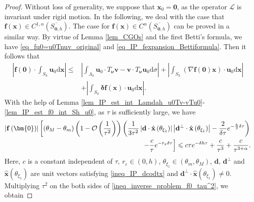 \documentclass[11pt,reqno,oneside]{amsart}
\theoremstyle{definition}
\theoremstyle{remark}
\numberwithin{equation}{section}
\numberwithin{equation}{section}
\theoremstyle{remark}
\begin{document}
\begin{proof} 
	Without loss of generality, we suppose that $ \mathbf{x}_0 = \bm{0} $, as the operator $ \mathcal{L} $ is invariant under rigid motion. In the following, we deal with the case that $\mathbf{f}\left(\mathbf{x}\right) \in C^{1,\alpha} \left(\overline{S_{\mathbf{0},h}}\right)$. The case for $\mathbf{f}\left(\mathbf{x}\right) \in C^{\alpha} \left(\overline{S_{\mathbf{0},h}}\right)$ can be proved in a similar way. By virtue of Lemma \ref{lem_CGOs} and the first Betti's formula, we have \eqref{eq_fu0=u0Tnuv_original} and \eqref{eq_IP_fexpansion_Bettiformula}. Then it follows that
	\begin{align*} 
		\left| \mathbf{f} \left(\bm{0}\right) \cdot \int_{S_h} \mathbf{u}_0 \mathrm{d}\mathbf{x} \right|	\leqslant & \left| \int_{\Lambda_h} \mathbf{u}_0 \cdot T_{\bm{\nu}} \mathbf{v} - \mathbf{v} \cdot T_{\bm{\nu}} \mathbf{u}_0 \mathrm{d}\sigma \right| + \left| \int_{S_h} \left( \nabla \mathbf{f} \left(\bm{0}\right) \mathbf{x} \right) \cdot \mathbf{u}_0 \mathrm{d}\mathbf{x} \right| \\
		& + \left| \int_{S_h} \bm{\delta} \mathbf{f} \left(\mathbf{x}\right) \cdot \mathbf{u}_0 \mathrm{d}\mathbf{x} \right|. 
	\end{align*}
	With the help of Lemma \ref{lem_IP_est_int_Lamdah_u0Tv-vTu0}-\ref{lem_IP_est_f0_int_Sh_u0}, as $ \tau $ is sufficiently large, we have  
	\begin{align} \label{ineq_inverse_problem_f0_tau^2}
		\left| \mathbf{f}\left(\bm{0}\right) \right|\left[\left(\theta_M-\theta_m\right)\left(1-\mathcal{O}\left(\frac{1}{\tau^2}\right)\right) \left(\frac{1}{3 \tau^2}\left|\mathbf{d}\cdot\hat{\mathbf{x}} \left(\theta_{\xi_1}\right)\right| \left|\mathbf{d}^{\perp}\cdot\hat{\mathbf{x}} \left(\theta_{\xi_1}\right)\right| - \frac{2}{\delta\tau} e^{-\frac{h}{2} \delta \tau}\right) \right. \notag \\
		\left.- \frac{c}{\tau}e^{-r_{\varepsilon} \delta \tau}\right] \leqslant  c \tau e^{- \delta h \tau} +  \frac{c}{\tau^3} + \frac{c}{\tau^{3+\alpha}}.
	\end{align}
	Here, $ c $ is a constant independent of $ \tau $, $ r_{\varepsilon}\in\left(0,h\right) $, $ \theta_{\xi_1} \in \left(\theta_m, \theta_M\right) $, $ \mathbf{d} $, $ \mathbf{d}^{\perp} $ and $ \hat{\mathbf{x}}\left(\theta_{\xi_1}\right) $ are unit vectors satisfying \eqref{ineq_IP_dcodtx} and $ \mathbf{d}^{\perp}\cdot\hat{\mathbf{x}} \left(\theta_{\xi_1}\right) \neq 0 $. Multiplying $ \tau^2 $ on the both sides of \eqref{ineq_inverse_problem_f0_tau^2}, we obtain 

\end{proof}
\end{document}
